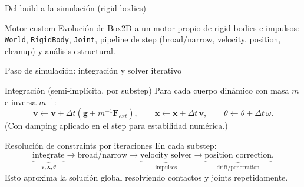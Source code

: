 \documentclass[aspectratio=169,11pt]{beamer}
\begin{document}
\begin{frame}{Del build a la simulación (rigid bodies)}
  \begin{center}
  \end{center}

  \begin{block}{Motor custom}
    Evolución de Box2D a un motor propio de rigid bodies e impulsos:
    \texttt{World}, \texttt{RigidBody}, \texttt{Joint}, pipeline de step
    (broad/narrow, velocity, position, cleanup) y análisis estructural.
  \end{block}
\end{frame}

\begin{frame}{Paso de simulación: integración y solver iterativo}
  \begin{block}{Integración (semi-implícita, por substep)}
    Para cada cuerpo dinámico con masa $m$ e inversa $m^{-1}$:
    \[
      \mathbf{v} \leftarrow \mathbf{v} + \Delta t\left(\mathbf{g} + m^{-1}\mathbf{F}_{ext}\right),
      \qquad
      \mathbf{x} \leftarrow \mathbf{x} + \Delta t\,\mathbf{v},
      \qquad
      \theta \leftarrow \theta + \Delta t\,\omega.
    \]
    (Con damping aplicado en el step para estabilidad numérica.)
  \end{block}

  \vspace{0.05cm}
  \begin{block}{Resolución de constraints por iteraciones}
    En cada substep:
    \[
      \underbrace{\text{integrate}}_{\mathbf{v},\mathbf{x},\theta}
      \rightarrow \text{broad/narrow}
      \rightarrow \underbrace{\text{velocity solver}}_{\text{impulses}}
      \rightarrow \underbrace{\text{position correction}}_{\text{drift/penetration}}.
    \]
    Esto aproxima la solución global resolviendo contactos y joints repetidamente.
  \end{block}
\end{frame}
\end{document}
